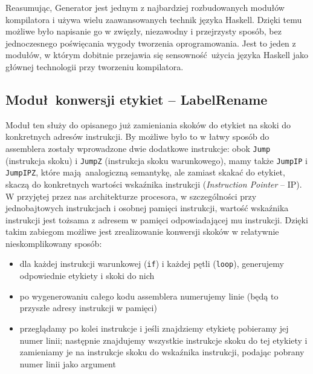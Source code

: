 Reasumując, Generator jest jednym z najbardziej rozbudowanych modułów kompilatora i używa wielu zaawansowanych technik języka Haskell. Dzięki temu możliwe było napisanie go w zwięzły, niezawodny i przejrzysty sposób, bez jednoczesnego poświęcania wygody tworzenia oprogramowania. Jest to jeden z modułów, w którym dobitnie przejawia się sensowność użycia języka Haskell jako głównej technologii przy tworzeniu kompilatora.

\subsection{Moduł konwersji etykiet -- LabelRename}

Moduł ten służy do opisanego już zamieniania skoków do etykiet na skoki do konkretnych adresów instrukcji. By możliwe było to w łatwy sposób do assemblera zostały wprowadzone dwie dodatkowe instrukcje: obok \texttt{Jump} (instrukcja skoku) i \texttt{JumpZ} (instrukcja skoku warunkowego), mamy także \texttt{JumpIP} i \texttt{JumpIPZ}, które mają analogiczną semantykę, ale zamiast skakać do etykiet, skaczą do konkretnych wartości wskaźnika instrukcji (\textit{Instruction Pointer} -- IP). W przyjętej przez nas architekturze procesora, w szczególności przy jednobajtowych instrukcjach i osobnej pamięci instrukcji, wartość wskaźnika instrukcji jest tożsama z adresem w pamięci odpowiadającej mu instrukcji. Dzięki takim zabiegom możliwe jest zrealizowanie konwersji skoków w relatywnie nieskomplikowany sposób:

\begin{itemize}
  \item dla każdej instrukcji warunkowej (\texttt{if}) i każdej pętli (\texttt{loop}), generujemy odpowiednie etykiety i skoki do nich
  \item po wygenerowaniu całego kodu assemblera numerujemy linie (będą to przyszłe adresy instrukcji w pamięci)
  \item przeglądamy po kolei instrukcje i jeśli znajdziemy etykietę pobieramy jej numer linii; następnie znajdujemy wszystkie instrukcje skoku do tej etykiety i zamieniamy je na instrukcje skoku do wskaźnika instrukcji, podając pobrany numer linii jako argument
\end{itemize}

